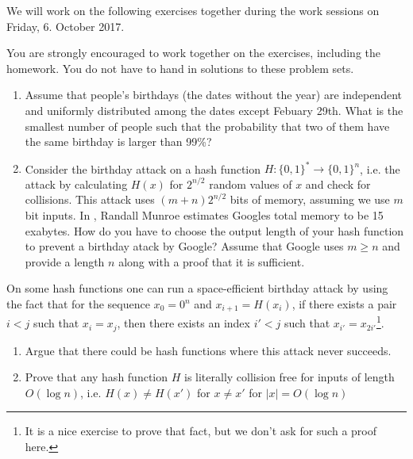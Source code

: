 \documentclass[a4paper,10pt,landscape,twocolumn]{scrartcl}
\newcommand\worksession{Friday, 6. October 2017}
\begin{document}
\problems

{\sffamily\noindent
We will work on the following exercises together during the work sessions on \worksession.

You are strongly encouraged to work together on the exercises, including the homework. You do not have to hand in solutions to these problem sets.}

\begin{exercise}
\begin{enumerate}
	\item Assume that people's birthdays (the dates without the year) are independent and uniformly distributed among the dates except Febuary 29th. What is the smallest number of people such that the probability that two of them have the same birthday is larger than 99\%?
	\item Consider the birthday attack on a hash function $H: \{0,1\}^*\to\{0,1\}^n$, i.e. the attack by calculating $H(x)$ for $2^{n/2}$ random values of $x$ and check for collisions. This attack uses $(m+n)2^{n/2}$ bits of memory, assuming we use $m$ bit inputs. In , Randall Munroe estimates Googles total memory to be 15 exabytes.  How do you have to choose the output length of your hash function to prevent a birthday atack by Google? Assume that Google uses $m\ge n$ and provide a length $n$ along with a proof that it is sufficient.
\end{enumerate}
\end{exercise}

\begin{exercise}
	On some hash functions one can run a space-efficient birthday attack by using the fact that for the sequence $x_0=0^n$ and $x_{i+1}=H(x_i)$, if there exists a pair $i<j$ such that $x_i=x_j$, then there exists an index $i'<j$ such that $x_{i'}=x_{2i'}$\footnote{It is a nice exercise to prove that fact, but we don't ask for such a proof here.}.
\begin{enumerate}
	\item Argue that there could be hash functions where this attack never succeeds.
	\item Prove that any hash function $H$ is literally collision free for inputs of length $O(\log n)$, i.e. $H(x)\neq H(x')$ for $x\neq x'$ for $|x|=O(\log n)$
\end{enumerate}
\end{exercise}
\end{document}

